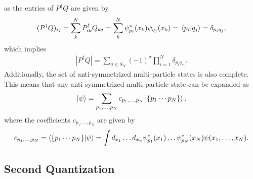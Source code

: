 \documentclass[Dual]{msu-thesis}
\begin{document}
as the entries of $P^\dagger Q$ are given by
\begin{align}
(P^\dagger Q)_{ij}
=\sum_k^NP^\dagger_{ik}Q_{kj}
=\sum_k^N\psi^*_{p_i}(x_k)\psi_{q_j}(x_k)
=\bra*{p_i}\ket*{q_j}
=\delta_{p_iq_j},
\end{align}
which implies
\begin{align}
|P^\dagger Q|=\sum_{\sigma\in S_N}(-1)^\sigma\prod_{i=1}^N\delta_{p_iq_{\sigma_i}}.
\end{align}
Additionally, the set of anti-symmetrized multi-particle states is also complete. This means that any anti-symmetrized multi-particle state can be expanded as
\begin{align}
\ket{\psi}=\sum_{p_1,\ldots ,p_N}c_{p_1,\ldots ,p_N}\ket{\{p_1\cdots p_N\}},
\end{align}
where the coefficients $c_{p_1,\ldots ,p_N}$ are given by
\begin{align}
c_{p_1,\ldots ,p_N}=\bra{\{p_1\cdots p_N\}}\ket{\psi}=\int d_{x_1}\ldots d_{x_n}\psi^*_{p_1}(x_1)\ldots \psi^*_{p_N}(x_N)\psi(x_1,\ldots ,x_N).    
\end{align}

\subsection{Second Quantization}

\nocite{morten_second_quant}
\end{document}
